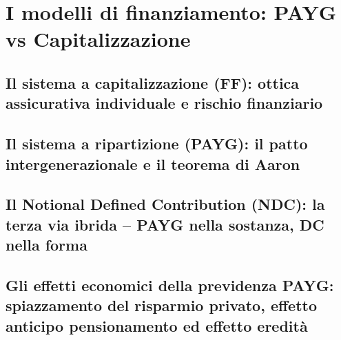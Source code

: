 \section{I modelli di finanziamento: PAYG vs Capitalizzazione}

    \subsection{Il sistema a capitalizzazione (FF):
                ottica assicurativa individuale e rischio finanziario}
    \subsection{Il sistema a ripartizione (PAYG):
                il patto intergenerazionale e il teorema di Aaron}
    \subsection{Il Notional Defined Contribution (NDC):
                la terza via ibrida -- PAYG nella sostanza,
                DC nella forma}
    \subsection{Gli effetti economici della previdenza PAYG:
                spiazzamento del risparmio privato, effetto anticipo
                pensionamento ed effetto eredità}

